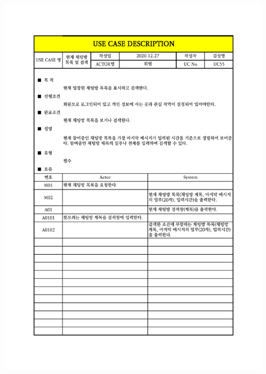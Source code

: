 {{{{{{{{{{{{{{{{{{{{{{{{{{{{{{{{{{{{{{{{{{{{{{{{{{{{{{{{{{\includegraphics[width=1.1\textwidth]{./Figure/Design/Display/usecase/055.pdf} \\
}}}}}}}}}}}}}}}}}}}}}}}}}}}}}}}}}}}}}}}}}}}}}}}}}}}}}}}}}}
